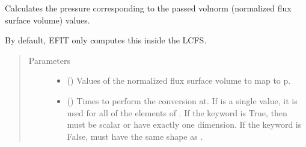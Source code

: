 \documentclass[letterpaper,10pt,english]{sphinxmanual}
\begin{document}
\begin{fulllineitems}
\begin{fulllineitems}
\begin{sphinxVerbatim}[commandchars=\\\{\}]
  \PYG{p}{[} \PYG{p}{]} \PYG{p}{[} \PYG{p}{]} 
\end{sphinxVerbatim}

\end{fulllineitems}


\begin{fulllineitems}
\label{\detokenize{eqtools:eqtools.core.Equilibrium.volnorm2p}}
Calculates the pressure corresponding to the passed volnorm (normalized flux surface volume) values.

By default, EFIT only computes this inside the LCFS.
\begin{quote}\begin{description}
\item[{Parameters}] \leavevmode\begin{itemize}
\item {} 
 () \textendash{} Values of the normalized
flux surface volume to map to p.

\item {} 
 () \textendash{} Times to perform the conversion at.
If  is a single value, it is used for all of the elements of
. If the  keyword is True, then  must be scalar
or have exactly one dimension. If the  keyword is False,
 must have the same shape as .

\end{itemize}


\end{description}
\end{quote}
\end{fulllineitems}
\end{fulllineitems}
\end{document}
